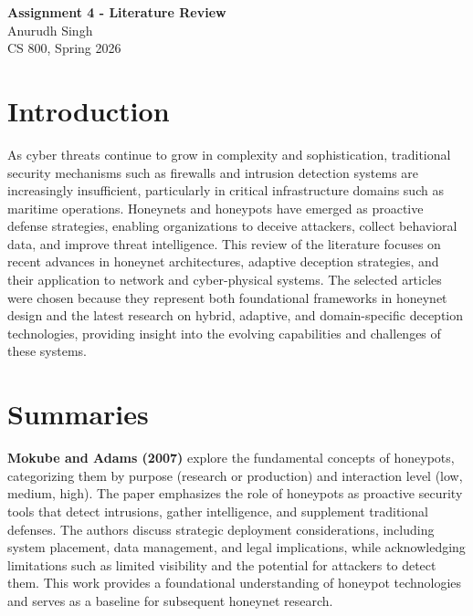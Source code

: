 \documentclass[12pt]{article}
\begin{document}
\begin{centering}
{\large\textbf{Assignment 4 - Literature Review}}\\
\vspace{3mm} %
Anurudh Singh\\
CS 800, Spring 2026\\
\end{centering}



\section{Introduction}
As cyber threats continue to grow in complexity and sophistication, traditional security mechanisms such as firewalls and intrusion detection systems are increasingly insufficient, particularly in critical infrastructure domains such as maritime operations. Honeynets and honeypots have emerged as proactive defense strategies, enabling organizations to deceive attackers, collect behavioral data, and improve threat intelligence. This review of the literature focuses on recent advances in honeynet architectures, adaptive deception strategies, and their application to network and cyber-physical systems. The selected articles were chosen because they represent both foundational frameworks in honeynet design and the latest research on hybrid, adaptive, and domain-specific deception technologies, providing insight into the evolving capabilities and challenges of these systems. 

\section{Summaries}
\textbf{Mokube and Adams (2007)} explore the fundamental concepts of honeypots, categorizing them by purpose (research or production) and interaction level (low, medium, high). The paper emphasizes the role of honeypots as proactive security tools that detect intrusions, gather intelligence, and supplement traditional defenses. The authors discuss strategic deployment considerations, including system placement, data management, and legal implications, while acknowledging limitations such as limited visibility and the potential for attackers to detect them. This work provides a foundational understanding of honeypot technologies and serves as a baseline for subsequent honeynet research.
\end{document}

